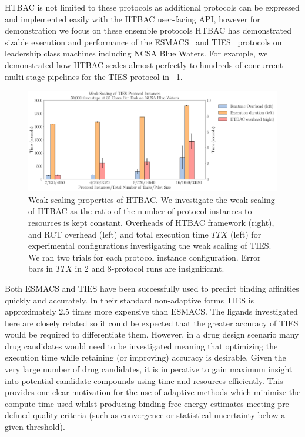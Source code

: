 \documentclass[conference]{IEEEtran}
\begin{document}
HTBAC is not limited to these protocols as additional protocols can be
expressed and implemented easily with the HTBAC user-facing API, however for
demonstration we focus on these ensemble protocols HTBAC has demonstrated
sizable execution and performance of the ESMACS~\cite{dakka2017} and TIES~\cite{dakka_farkaspall} protocols on leadership
class machines including NCSA Blue Waters. For example, we demonstrated how HTBAC
scales almost perfectly to hundreds of concurrent multi-stage pipelines for the TIES 
protocol in ~\ref{fig:weak_scaling}.

\begin{figure}
  \centering
   \includegraphics[width=\columnwidth]
   {weak_scaling_TIES_instances_50,000_timesteps_with_16_instances.pdf}
  \caption{Weak scaling properties of HTBAC. We investigate the
  weak scaling of HTBAC as the ratio of the number of protocol instances to
  resources is kept constant. Overheads of HTBAC framework (right), and RCT overhead 
  (left) and total execution time \(TTX\) (left) for experimental configurations investigating the 
  weak scaling of TIES. We ran two trials for each protocol instance 
  configuration. Error bars in \(TTX\) in 2 and 8-protocol runs are 
  insignificant.}
\label{fig:weak_scaling}
\end{figure}

Both ESMACS and TIES have been successfully used to predict binding affinities
quickly and accurately. 
In their standard non-adaptive forms TIES is approximately 2.5 times more expensive
than ESMACS.
The ligands investigated here are closely related so it could be expected that the
greater accuracy of TIES would be required to differentiate them.
However, in a drug design scenario many drug candidates would need to be investigated
meaning that optimizing the execution time while retaining (or improving) accuracy is
desirable. 
Given the very large number of drug candidates, it is imperative to
gain maximum insight into potential candidate compounds using time and
resources efficiently. 
This provides one clear motivation for the use of
adaptive methods which minimize the compute time used whilst producing binding
free energy estimates meeting pre-defined quality criteria (such as
convergence or statistical uncertainty below a given threshold).
\end{document}

